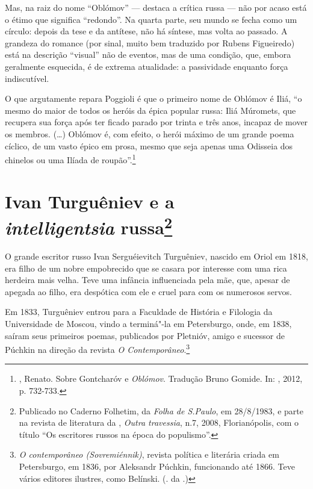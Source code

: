 Mas, na raiz do nome ``Oblómov'' --- destaca a crítica russa --- não por acaso está o étimo que significa ``redondo''. Na quarta parte, seu mundo se fecha como um círculo: depois da tese e da antítese, não há síntese, mas volta ao passado. A grandeza do romance (por sinal, muito bem traduzido por Rubens Figueiredo) está na descrição ``visual'' não de eventos, mas de uma condição, que, embora geralmente esquecida, é de extrema atualidade: a passividade enquanto força indiscutível. 

O que argutamente repara Poggioli é que o primeiro nome de Oblómov é Iliá, ``o mesmo do maior de todos os heróis da épica popular russa: Iliá Múromets, que recupera sua força após ter ficado parado por trinta e três anos, incapaz de mover os membros. (\ldots{}) Oblómov é, com efeito, o herói máximo de um grande poema cíclico, de um vasto épico em prosa, mesmo que seja apenas uma Odisseia dos chinelos ou uma Ilíada de roupão''.\footnote{, Renato. Sobre Gontcharóv e \emph{Oblómov}. Tradução Bruno Gomide. In: , 2012, p. 732-733.}

\chapter{Ivan Turguêniev e a\\ \emph{intelligentsia} russa\footnote{Publicado no Caderno Folhetim, da \emph{Folha de S.Paulo}, em 28/8/1983, e parte na revista de literatura da \protect{}, \emph{Outra travessia}, n.7, 2008, Florianópolis, com o título ``Os escritores russos na época do populismo''.}}
\label{turgueniev}

O grande escritor russo Ivan Serguéievitch Turguêniev, nascido
em Oriol em 1818, era filho de um nobre empobrecido que se casara
por interesse com uma rica
herdeira mais velha. Teve uma infância influenciada pela mãe, que,
apesar de apegada ao filho, era despótica com ele e cruel para com os numerosos servos.

Em 1833, Turguêniev entrou para a Faculdade de História e Filologia da Universidade de Moscou, vindo a terminá"-la em Petersburgo, onde, em 1838, saíram seus primeiros poemas, publicados por
Pletnióv, amigo e sucessor de Púchkin na direção da revista \emph{O
Contemporâneo}.\footnote{\emph{O contemporâneo (Sovremiénnik)}, revista política e literária criada em Petersburgo, em 1836, por Aleksandr Púchkin, funcionando até 1866. Teve vários editores ilustres, como Belínski. (. da .)}

